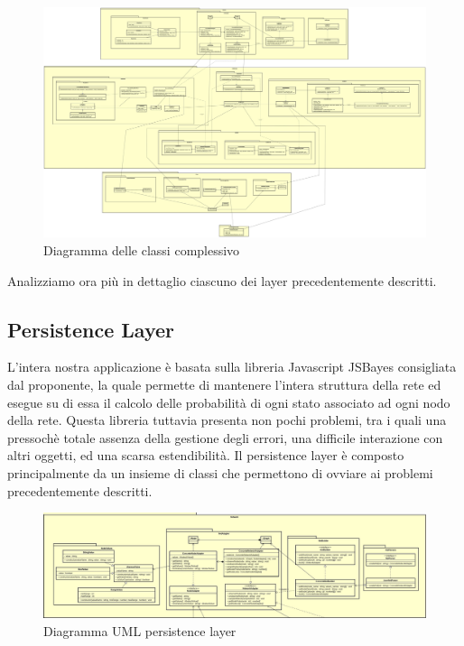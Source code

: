 \begin{figure} [H]
	\centering
	\includegraphics[scale=0.07]{Img/Diagramma_Classi}
	\caption{Diagramma delle classi complessivo}\label{}
\end{figure}
Analizziamo ora più in dettaglio ciascuno dei layer precedentemente descritti.
\subsection{Persistence Layer}
L'intera nostra applicazione è basata sulla libreria Javascript JSBayes consigliata dal proponente, la quale permette di mantenere l'intera struttura della rete ed esegue su di essa il calcolo delle probabilità di ogni stato associato ad ogni nodo della rete.
Questa libreria tuttavia presenta non pochi problemi, tra i quali una pressochè totale assenza della gestione degli errori, una difficile interazione con altri oggetti, ed una scarsa estendibilità.
Il persistence layer è composto principalmente da un insieme di classi che permettono di ovviare ai problemi precedentemente descritti.
\begin{figure} [H]
	\centerline{
	\includegraphics[scale=0.25]{Img/PersistenceLayer2}}
	\caption{Diagramma UML persistence layer}\label{}
\end{figure}
